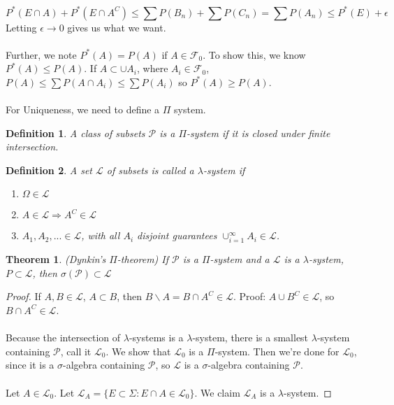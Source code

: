 \documentclass[12pt]{article}
\newtheorem{theorem}{Theorem}
\newtheorem{defn}{Definition}
\begin{document}
$$P^*(E \cap A) + P^*(E \cap A^C) \le \sum P(B_n) + \sum P(C_n) = \sum P(A_n) \le P^*(E) + \epsilon$$
Letting $\epsilon \to 0$ gives us what we want.
\\ \\
Further, we note $P^*(A) = P(A)$ if $A \in \mathcal{F}_0$.  To show this, we know $P^*(A) \le P(A)$.  If $A \subset \cup A_i$, where $A_i \in \mathcal{F}_0$, $P(A) \le \sum P(A \cap A_i) \le \sum P(A_i)$ so $P^*(A) \ge P(A)$.
\\ \\
For Uniqueness, we need to define a $\Pi$ system.

\begin{defn}
A class of subsets $\mathcal{P}$ is a $\Pi$-system if it is closed under finite intersection.
\end{defn}

\begin{defn}
A set $\mathcal{L}$ of subsets is called a $\lambda$-system if
\begin{enumerate}
\item $\Omega \in \mathcal{L}$
\item $A \in \mathcal{L} \Rightarrow A^C \in \mathcal{L}$
\item $A_1, A_2, ... \in \mathcal{L}$, with all $A_i$ disjoint guarantees $\cup_{i=1}^\infty A_i \in \mathcal{L}$.
\end{enumerate}
\end{defn}

\begin{theorem}
(Dynkin's $\Pi$-theorem) If $\mathcal{P}$ is a $\Pi$-system and a $\mathcal{L}$ is a $\lambda$-system, $P \subset \mathcal{L}$, then $\sigma(\mathcal{P}) \subset \mathcal{L}$
\end{theorem}
\begin{proof}
If $A, B \in \mathcal{L}$, $A \subset B$, then $B \backslash A = B \cap A^C \in \mathcal{L}$.  Proof: $A \cup B^C \in \mathcal{L}$, so $B \cap A^C \in \mathcal{L}$.
\\ \\
Because the intersection of $\lambda$-systems is a $\lambda$-system, there is a smallest $\lambda$-system containing $\mathcal{P}$, call it $\mathcal{L}_0$.  We show that $\mathcal{L}_0$ is a $\Pi$-system.  Then we're done for $\mathcal{L}_0$, since it is a $\sigma$-algebra containing $\mathcal{P}$, so $\mathcal{L}$ is a $\sigma$-algebra containing $\mathcal{P}$.
\\ \\
Let $A \in \mathcal{L}_0$.  Let $\mathcal{L}_A = \{ E \subset \Sigma: E \cap A \in \mathcal{L}_0 \}$.  We claim $\mathcal{L}_A$ is a $\lambda$-system.  
\end{proof}
\end{document}
